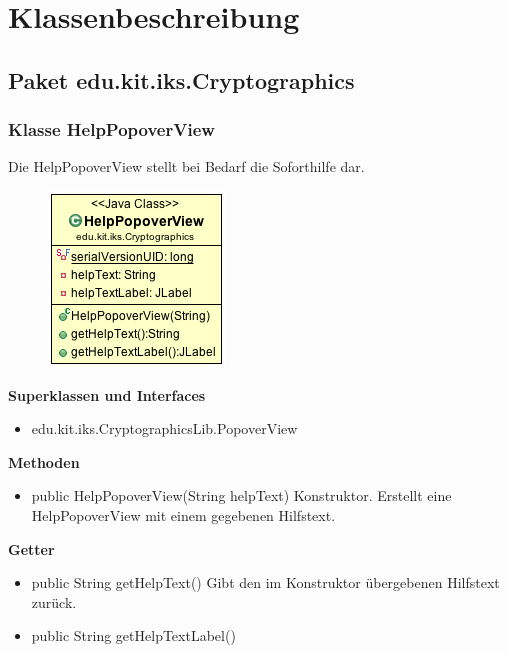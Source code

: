 \documentclass{article}
\begin{document}
\section{Klassenbeschreibung}
  \subsection{Paket edu.kit.iks.Cryptographics}
    \subsubsection{Klasse HelpPopoverView}
      Die HelpPopoverView stellt bei Bedarf die Soforthilfe dar.
      \begin{figure}[H]
        \centering
        \includegraphics{resources/edu-kit-iks-Cryptographics-HelpPopoverView}
      \end{figure}

      \textbf{Superklassen und Interfaces}
      \begin{itemize}
        \item edu.kit.iks.CryptographicsLib.PopoverView
      \end{itemize}
      
      \textbf{Methoden}
      \begin{itemize}
        \item public HelpPopoverView(String helpText) \newline
        Konstruktor. Erstellt eine HelpPopoverView mit einem gegebenen Hilfstext.
      \end{itemize}

      \textbf{Getter}
      \begin{itemize}
        \item public String getHelpText() \newline
        Gibt den im Konstruktor übergebenen Hilfstext zurück.
        \item public String getHelpTextLabel() \newline
      \end{itemize}
\end{document}
